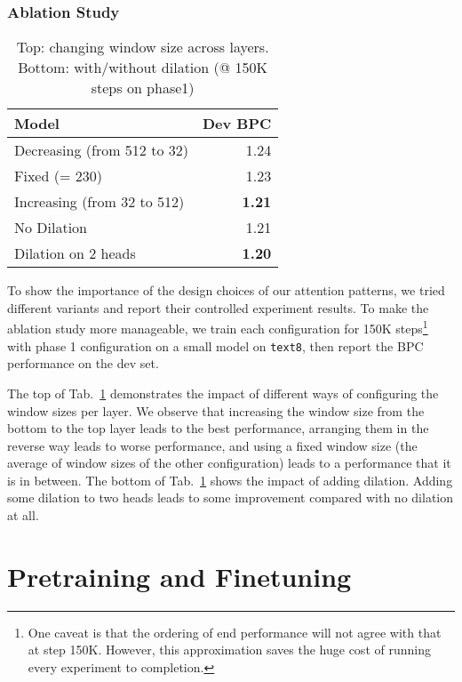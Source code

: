 \documentclass[11pt,a4paper]{article}
\begin{document}
\subsubsection{Ablation Study}

\begin{table}[t]
    \centering
    \small
    \begin{tabular}{@{}lr@{}}
    \toprule
    Model & Dev BPC \\
    \midrule
    Decreasing  (from 512 to 32) & 1.24 \\
    Fixed  (= 230) &  1.23 \\
    Increasing  (from 32 to 512) &\textbf{ 1.21} \\
    \midrule
    No Dilation &  1.21 \\
    Dilation on 2 heads &  \textbf{1.20} \\
    \bottomrule
    \end{tabular}
    \caption{Top: changing window size
    across layers. Bottom: with/without dilation (@ 150K steps on phase1)}
    \label{tab:ablation_charlm}
\end{table}








To show the importance of the design choices of our attention patterns, we tried different variants and report their controlled experiment results. 
To make the ablation study more manageable, we train each configuration for 150K steps\footnote{
One caveat is that the ordering of end performance will not agree with that at step 150K.
However, this approximation saves the huge cost of running every experiment to completion.}
with phase 1 configuration on a small model on \texttt{text8}, then report the BPC performance on the dev set. 

The top of Tab.~\ref{tab:ablation_charlm} demonstrates the impact of different ways of configuring the window sizes per layer. We observe that increasing the window size from the bottom 
to the top layer leads to the best performance, arranging them in the reverse way leads to worse performance,
and using a fixed window size (the average of window sizes of the other configuration) leads to a performance that it is in between.
The bottom of Tab.~\ref{tab:ablation_charlm} shows the impact of adding dilation.
Adding some dilation to two heads leads to some improvement compared with 
no dilation at all. 



 
\section{Pretraining and Finetuning}
\label{sec:pretrain}
\end{document}
